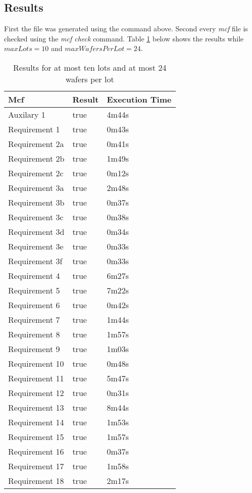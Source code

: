 \subsection{Results}
First the  file was generated using the  command above. Second every \textit{mcf} file is checked using the \textit{mcf check} command.
Table \ref{tab:results10-24} below shows the results while $\mathit{maxLots} = 10$ and $\mathit{maxWafersPerLot} = 24$.
\begin{table}[!hb]
    \centering
    \begin{tabular}{|l|l|l|}
        \hline
        \textbf{Mcf} & \textbf{Result} & \textbf{Execution Time} \\ \hline
        Auxilary 1 & true & 4m44s \\ \hline
        Requirement 1 & true & 0m43s \\ \hline
        Requirement 2a & true & 0m41s \\ \hline
        Requirement 2b & true & 1m49s \\ \hline
        Requirement 2c & true & 0m12s \\ \hline
        Requirement 3a & true & 2m48s \\ \hline
        Requirement 3b & true & 0m37s \\ \hline
        Requirement 3c & true & 0m38s \\ \hline
        Requirement 3d & true & 0m34s \\ \hline
        Requirement 3e & true & 0m33s \\ \hline
        Requirement 3f & true & 0m33s \\ \hline
        Requirement 4 & true & 6m27s \\ \hline
        Requirement 5 & true & 7m22s \\ \hline
        Requirement 6 & true & 0m42s \\ \hline
        Requirement 7 & true & 1m44s \\ \hline
        Requirement 8 & true & 1m57s \\ \hline
        Requirement 9 & true & 1m03s \\ \hline
        Requirement 10 & true & 0m48s \\ \hline
        Requirement 11 & true & 5m47s \\ \hline
        Requirement 12 & true & 0m31s \\ \hline
        Requirement 13 & true & 8m44s \\ \hline
        Requirement 14 & true & 1m53s \\ \hline
        Requirement 15 & true & 1m57s \\ \hline
        Requirement 16 & true & 0m37s \\ \hline
        Requirement 17 & true & 1m58s \\ \hline
        Requirement 18 & true & 2m17s \\ \hline
    \end{tabular}
    \caption{Results for at most ten lots and at most 24 wafers per lot}
    \label{tab:results10-24}
\end{table}